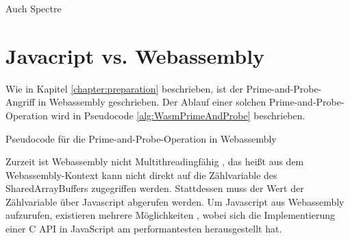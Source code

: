 

Auch Spectre



\section{Javacript vs. Webassembly}
\label{JavascriptVSWasm}

Wie in Kapitel \ref{chapter:preparation} beschrieben, ist der Prime-and-Probe-Angriff in Webassembly geschrieben.
Der Ablauf einer solchen Prime-and-Probe-Operation wird in Pseudocode \ref{alg:WasmPrimeAndProbe} beschrieben.

\begin{algorithm}[h]
\DontPrintSemicolon
\caption{Pseudocode für die Prime-and-Probe-Operation in Webassembly}
\label{alg:WasmPrimeAndProbe}

\end{algorithm}

Zurzeit ist Webassembly nicht Multithreadingfähig \cite{WebassemblyThreads}, das heißt aus dem Webassembly-Kontext kann nicht direkt auf die Zählvariable des SharedArrayBuffers zugegriffen werden.
Stattdessen muss der Wert der Zählvariable über Javascript abgerufen werden.
Um Javascript aus Webassembly aufzurufen, existieren mehrere Möglichkeiten \cite{CallJavaScriptFromWasm}, wobei sich die Implementierung einer C API in JavaScript am performantesten herausgestellt hat.

